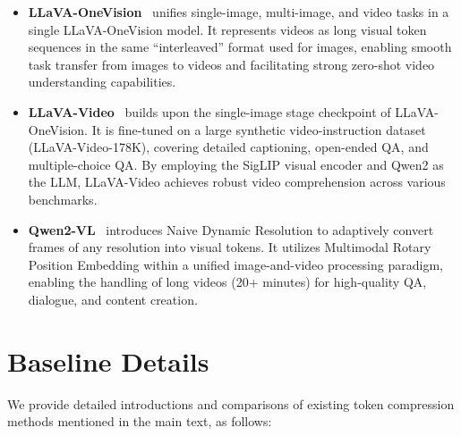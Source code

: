 \begin{itemize}

    \item \textbf{LLaVA-OneVision}~\cite{li2024llava-ov} unifies single-image, multi-image, and video tasks in a single LLaVA-OneVision model. It represents videos as long visual token sequences in the same ``interleaved'' format used for images, enabling smooth task transfer from images to videos and facilitating strong zero-shot video understanding capabilities.
    
    \item \textbf{LLaVA-Video}~\cite{zhang2024llava-video} builds upon the single-image stage checkpoint of LLaVA-OneVision. It is fine-tuned on a large synthetic video-instruction dataset (LLaVA-Video-178K), covering detailed captioning, open-ended QA, and multiple-choice QA. By employing the SigLIP visual encoder and Qwen2 as the LLM, LLaVA-Video achieves robust video comprehension across various benchmarks.
    
    \item \textbf{Qwen2-VL}~\cite{Wang:Qwen2-VL} introduces Naive Dynamic Resolution to adaptively convert frames of any resolution into visual tokens. It utilizes Multimodal Rotary Position Embedding within a unified image-and-video processing paradigm, enabling the handling of long videos (20+ minutes) for high-quality QA, dialogue, and content creation.

\end{itemize}



\section{Baseline Details}
\label{sec:appendix/baselines}

We provide detailed introductions and comparisons of existing token compression methods mentioned in the main text, as follows:

